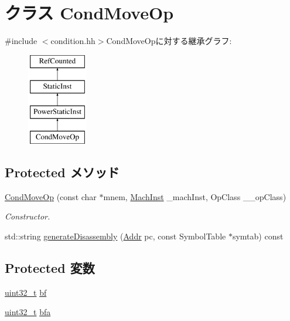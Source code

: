 \hypertarget{classPowerISA_1_1CondMoveOp}{
\section{クラス CondMoveOp}
\label{classPowerISA_1_1CondMoveOp}
}


{\ttfamily \#include $<$condition.hh$>$}CondMoveOpに対する継承グラフ:\begin{figure}[H]
\begin{center}
\leavevmode
\includegraphics[height=4cm]{classPowerISA_1_1CondMoveOp}
\end{center}
\end{figure}
\subsection*{Protected メソッド}
\begin{DoxyCompactItemize}
\item 
\hyperlink{classPowerISA_1_1CondMoveOp_a65b2deeb0b644289fd1bb06b919e42f7}{CondMoveOp} (const char $\ast$mnem, \hyperlink{namespacePowerISA_a301c22ea09fa33dcfe6ddf22f203699c}{MachInst} \_\-machInst, OpClass \_\-\_\-opClass)
\begin{DoxyCompactList}\small\item\em Constructor. \item\end{DoxyCompactList}\item 
std::string \hyperlink{classPowerISA_1_1CondMoveOp_a95d323a22a5f07e14d6b4c9385a91896}{generateDisassembly} (\hyperlink{base_2types_8hh_af1bb03d6a4ee096394a6749f0a169232}{Addr} pc, const SymbolTable $\ast$symtab) const 
\end{DoxyCompactItemize}
\subsection*{Protected 変数}
\begin{DoxyCompactItemize}
\item 
\hyperlink{Type_8hh_a435d1572bf3f880d55459d9805097f62}{uint32\_\-t} \hyperlink{classPowerISA_1_1CondMoveOp_aef9d89f66473031c63ee358d34cdc3f5}{bf}
\item 
\hyperlink{Type_8hh_a435d1572bf3f880d55459d9805097f62}{uint32\_\-t} \hyperlink{classPowerISA_1_1CondMoveOp_a136f3096a91e43c92c66b6f5b7be69b8}{bfa}
\end{DoxyCompactItemize}


